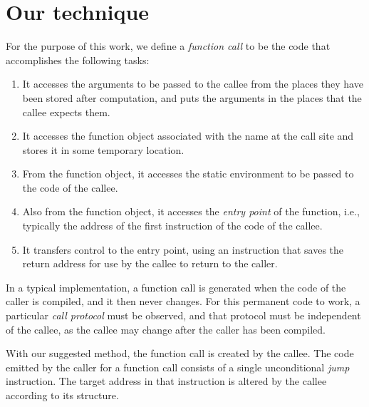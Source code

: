 \section{Our technique}
\label{sec-our-technique}

For the purpose of this work, we define a \emph{function call} to be
the code that accomplishes the following tasks:

\begin{enumerate}
\item It accesses the arguments to be passed to the callee from the
  places they have been stored after computation, and puts the
  arguments in the places that the callee expects them.
\item It accesses the function object associated with the name at the
  call site and stores it in some temporary location.
\item From the function object, it accesses the static environment to
  be passed to the code of the callee.
\item Also from the function object, it accesses the \emph{entry
  point} of the function, i.e., typically the address of the first
  instruction of the code of the callee.
\item It transfers control to the entry point, using an instruction
  that saves the return address for use by the callee to return to the
  caller.
\end{enumerate}

In a typical implementation, a function call is generated when the
code of the caller is compiled, and it then never changes.  For this
permanent code to work, a particular \emph{call protocol} must be
observed, and that protocol must be independent of the callee, as the
callee may change after the caller has been compiled.

With our suggested method, the function call is created by the
callee.  The code emitted by the caller for a function call consists
of a single unconditional \emph{jump} instruction.  The target address
in that instruction is altered by the callee according to its
structure.
